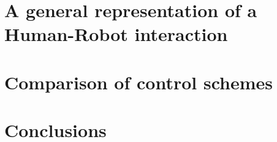\documentclass[preprint,12pt,3p]{elsarticle}
\begin{document}
\section{A general representation of a Human-Robot interaction}
\label{GHRI}
\section{Comparison of control schemes}
\label{CCS}
\section{Conclusions}
\label{Concl}



\end{document}

